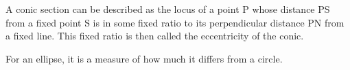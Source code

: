 A conic section can be described as the locus of a point P whose distance
PS from a fixed point S is in some fixed ratio to its perpendicular distance PN
from a fixed line. This fixed ratio is then called the eccentricity of the 
conic. 
\par
For an ellipse, it is a measure of how much it differs from a circle.